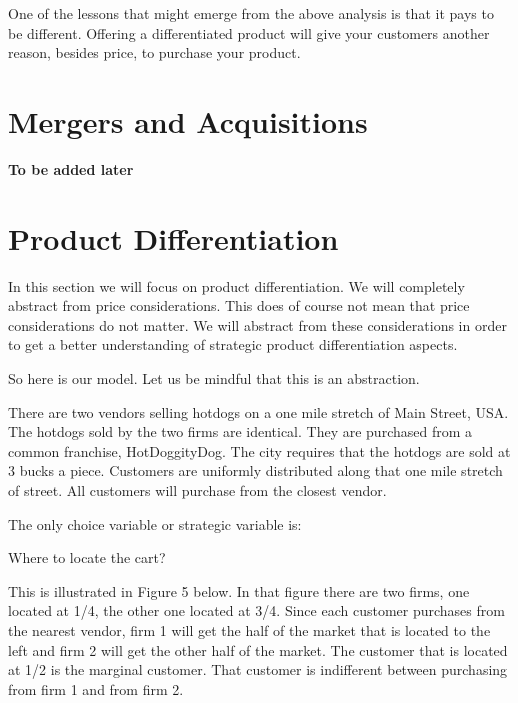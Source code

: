 \documentclass[
]{book}
\begin{document}
One of the lessons that might emerge from the above analysis is that it pays to be different. Offering a differentiated product will give your customers another reason, besides price, to purchase your product.

\hypertarget{mergers-and-acquisitions}{%
\section{Mergers and Acquisitions}\label{mergers-and-acquisitions}}

\begin{addition}
\textbf{To be added later}

\end{addition}

\hypertarget{product-differentiation}{%
\section{Product Differentiation}\label{product-differentiation}}

In this section we will focus on product differentiation. We will completely abstract from price considerations. This does of course not mean that price considerations do not matter. We will abstract from these considerations in order to get a better understanding of strategic product differentiation aspects.

So here is our model. Let us be mindful that this is an abstraction.

There are two vendors selling hotdogs on a one mile stretch of Main Street, USA. The hotdogs sold by the two firms are identical. They are purchased from a common franchise, HotDoggityDog. The city requires that the hotdogs are sold at 3 bucks a piece. Customers are uniformly distributed along that one mile stretch of street. All customers will purchase from the closest vendor.

The only choice variable or strategic variable is:

Where to locate the cart?

This is illustrated in Figure 5 below. In that figure there are two firms, one located at 1/4, the other one located at 3/4. Since each customer purchases from the nearest vendor, firm 1 will get the half of the market that is located to the left and firm 2 will get the other half of the market. The customer that is located at 1/2 is the marginal customer. That customer is indifferent between purchasing from firm 1 and from firm 2.
\end{document}
